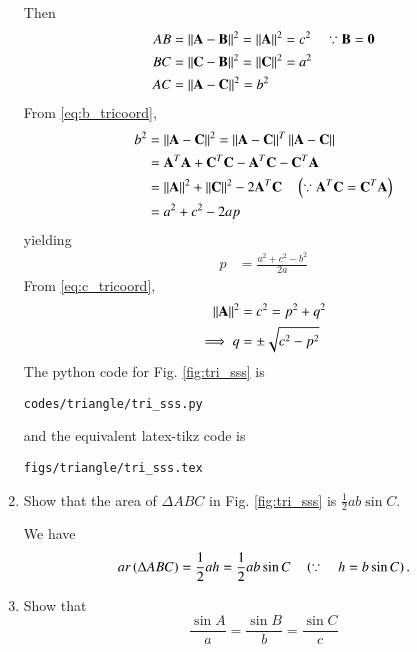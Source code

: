 \begin{enumerate}[label=\arabic*.,ref=\thesubsection.\theenumi]
Then
\begin{align}
\label{eq:c_tricoord}
AB &= \left\lVert\mathbf{A}-\mathbf{B}\right\rVert^2 = \left\lVert\mathbf{A}\right\rVert^2  = c^2 \quad \because \mathbf{B} = \mathbf{0}
\\
\label{eq:a_tricoord}
BC &= \left\lVert\mathbf{C}-\mathbf{B}\right\rVert^2 = \left\lVert\mathbf{C}\right\rVert^2  = a^2
\\
AC &= \left\lVert\mathbf{A}-\mathbf{C}\right\rVert^2 =    b^2
\label{eq:b_tricoord}
\end{align}
%
From \eqref{eq:b_tricoord},
\begin{align}
b^2 &=\left\lVert\mathbf{A}-\mathbf{C}\right\rVert^2 = \left\lVert\mathbf{A}-\mathbf{C}\right\rVert^T\left\lVert\mathbf{A}-\mathbf{C}\right\rVert  
\\
&= \mathbf{A}^T\mathbf{A}+\mathbf{C}^T\mathbf{C}-\mathbf{A}^T\mathbf{C} - \mathbf{C}^T\mathbf{A} 
\\
&= \left\lVert\mathbf{A}\right\rVert^2 + \left\lVert\mathbf{C}\right\rVert^2 - 2\mathbf{A}^T\mathbf{C} \quad \left(\because \mathbf{A}^T\mathbf{C} = \mathbf{C}^T\mathbf{A} \right) 
\label{eq:tri_const_norm_ac}
\\
&= a^2+c^2-2ap
\end{align}
%
yielding
\begin{align}
p&= \frac{a^2+c^2-b^2}{2a}
\end{align}
%
From \eqref{eq:c_tricoord}, 
\begin{align}
\left\lVert\mathbf{A}\right\rVert^2 &= c^2 = p^2+q^2
\\
\implies q&= \pm \sqrt{c^2-p^2}
\end{align}
%
The python code for  Fig. \ref{fig:tri_sss} is
\begin{lstlisting}
codes/triangle/tri_sss.py
\end{lstlisting}
%
and the equivalent latex-tikz code is
%
\begin{lstlisting}
figs/triangle/tri_sss.tex
\end{lstlisting}

\item
\label{prob:tri_area_sin}
	Show that the area of $\Delta ABC$ in Fig. 	\ref{fig:tri_sss}	is $\frac{1}{2}ab \sin C$.

\solution We have
%
\begin{equation}
ar\left(\Delta ABC\right) = \frac{1}{2}ah = \frac{1}{2}ab\sin C \quad \left(\because \quad h = b \sin C\right).
\end{equation}
%
\item
	Show that 
	\begin{equation}
	\frac{\sin A}{a} = \frac{\sin B}{b} = \frac{\sin C}{c}
	\end{equation}


\end{enumerate}
